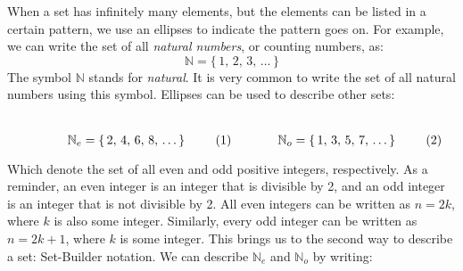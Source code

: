 \documentclass[crop=false,class=book,oneside]{standalone}
\begin{document}
            When a set has infinitely many
            elements, but the elements can be listed
            in a certain pattern, we use an ellipses
            to indicate the pattern goes on.
            For example, we can write the set of all
            \textit{natural numbers}, or counting
            numbers, as:
            \begin{equation}
                \mathbb{N}=\{\,1,\,2,\,3,\,\hdots\,\}
            \end{equation}
            The symbol $\mathbb{N}$ stands for
            \textit{natural}. It is very common to write the set
            of all natural numbers using this symbol.
            Ellipses can be used to describe other sets:
            \par
            \begin{subequations}
                \begin{minipage}{0.49\textwidth}
                    \centering
                    \begin{equation}
                        \mathbb{N}_{e}
                        =\{\,2,\,4,\,6,\,8,\,\hdots\,\}
                    \end{equation}
                \end{minipage}
                \hfill
                \begin{minipage}{0.49\textwidth}
                    \centering
                    \begin{equation}
                        \mathbb{N}_{o}
                        =\{\,1,\,3,\,5,\,7,\,\hdots\,\}
                    \end{equation}
                \end{minipage}
            \end{subequations}
            \par\vspace{2.5ex}
            Which denote the set of all even and odd
            positive integers, respectively. As a reminder,
            an even integer is an integer that is
            divisible by 2, and an odd integer is an
            integer that is not divisible by 2. All even
            integers can be written as $n=2k$, where $k$
            is also some integer. Similarly, every odd
            integer can be written as $n=2k+1$, where
            $k$ is some integer. This brings us to the
            second way to describe a set: Set-Builder notation.
            We can describe $\mathbb{N}_{e}$ and $\mathbb{N}_{o}$
            by writing:
            \par
\end{document}
